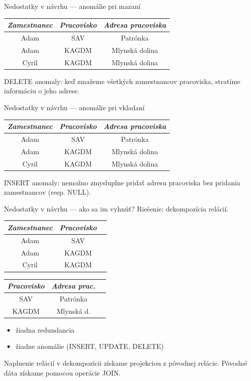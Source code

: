 \documentclass[12pt]{beamer}
\begin{document}
\begin{frame}[fragile]{Nedostatky v návrhu --- anomálie pri mazaní}
\begin{tabular}{|c|c|c|}
\hline
\emph{Zamestnanec} & \emph{Pracovisko} & \emph{Adresa pracoviska} \\\hline
Adam & SAV & Patrónka \\\hline
Adam & KAGDM & Mlynská dolina \\\hline
Cyril & KAGDM & Mlynská dolina \\\hline
\end{tabular}
\bigskip

\alert{DELETE anomaly}: keď zmažeme všetkých zamestnancov pracoviska, stratíme informáciu o jeho adrese.
\end{frame}

\begin{frame}[fragile]{Nedostatky v návrhu --- anomálie pri vkladaní}
\begin{tabular}{|c|c|c|}
\hline
\emph{Zamestnanec} & \emph{Pracovisko} & \emph{Adresa pracoviska} \\\hline
Adam & SAV & Patrónka \\\hline
Adam & KAGDM & Mlynská dolina \\\hline
Cyril & KAGDM & Mlynská dolina \\\hline
\end{tabular}
\bigskip

\alert{INSERT anomaly}: nemožno zmysluplne pridať adresu pracoviska bez pridania zamestnancov (resp. NULL).
\end{frame}

\begin{frame}[fragile]{Nedostatky v návrhu --- ako sa im vyhnúť?}
Riešenie: dekompozícia relácií.

\bigskip
\begin{tabular}{|c|c|c|}
\hline
\emph{Zamestnanec} & \emph{Pracovisko} \\\hline
Adam & SAV \\\hline
Adam & KAGDM \\\hline
Cyril & KAGDM \\\hline
\end{tabular}
\begin{tabular}{|c|c|c|}
\hline
\emph{Pracovisko} & \emph{Adresa prac.} \\\hline
SAV & Patrónka \\\hline
KAGDM & Mlynská d. \\\hline
\end{tabular}
\bigskip

\begin{itemize}
\item žiadna redundancia
\item žiadne anomálie (INSERT, UPDATE, DELETE)
\end{itemize}

\bigskip
Naplnenie relácií v dekompozícii získame projekciou z pôvodnej relácie.
Pôvodné dáta získame pomocou operácie JOIN.
\end{frame}
\end{document}
